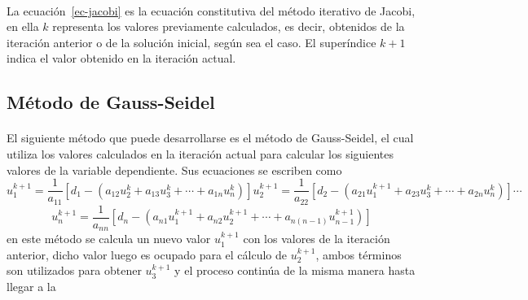 \documentclass[letterpaper, openright, 12pt]{book}
\begin{document}
    \paragraph*{}
        La ecuación~\ref{ec-jacobi} es la ecuación constitutiva del método
        iterativo de Jacobi, en ella $k$ representa los valores previamente
        calculados, es decir, obtenidos de la iteración anterior o de la
        solución inicial, según sea el caso. El superíndice $k+1$ indica el
        valor obtenido en la iteración actual.
    \subsection{Método de Gauss-Seidel}
    \paragraph*{}
        El siguiente método que puede desarrollarse es el método de Gauss-Seidel,
        el cual utiliza los valores calculados en la iteración actual para
        calcular los siguientes valores de la variable dependiente. Sus
        ecuaciones se escriben como
        \begin{subequations}
            \begin{equation*}
                u_{1}^{k+1} = \frac{1}{a_{11}} \left[ d_{1} - \left( a_{12}u_{2}^{k} + a_{13}u_{3}^{k} + \dotsb + a_{1n}u_{n}^k \right) \right]
            \end{equation*}
            \begin{equation*}
                u_{2}^{k+1} = \frac{1}{a_{22}} \left[ d_{2} - \left( a_{21}u_{1}^{k+1} + a_{23}u_{3}^{k} + \dotsb + a_{2n}u_{n}^{k} \right) \right]
            \end{equation*}
            \begin{equation*}
                \dotsb
            \end{equation*}
        \end{subequations}
        \begin{equation}
            u_{n}^{k+1} = \frac{1}{a_{nn}} \left[ d_{n} - \left( a_{n1}u_{1}^{k+1} + a_{n2}u_{2}^{k+1} + \dotsb + a_{n\left( n-1 \right)}u_{n-1}^{k+1} \right) \right]
            \label{ec-GS}
        \end{equation}
        en este método se calcula un nuevo valor $u_{1}^{k+1}$ con los valores
        de la iteración anterior, dicho valor luego es ocupado para
        el cálculo de $u_{2}^{k+1}$, ambos términos son utilizados para obtener
        $u_{3}^{k+1}$ y el proceso continúa de la misma manera hasta llegar a la
\end{document}
